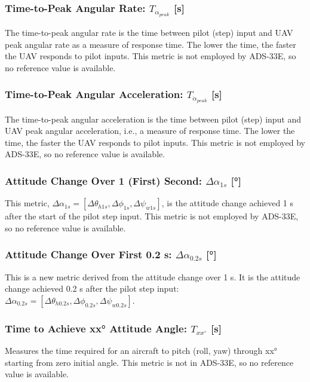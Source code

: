 \subsubsection{Time-to-Peak Angular Rate: \(T_{\dot{\alpha}_{peak}}\) [s]}
The time-to-peak angular rate is the time between pilot (step) input and UAV peak angular rate as a measure of response time. The lower the time, the faster the UAV responds to pilot inputs. This metric is not employed by ADS-33E, so no reference value is available.

\subsubsection{Time-to-Peak Angular Acceleration: \(T_{\dot{\alpha}_{peak}}\) [s]}
The time-to-peak angular acceleration is the time between pilot (step) input and UAV peak angular acceleration, i.e., a measure of response time. The lower the time, the faster the UAV responds to pilot inputs. This metric is not employed by ADS-33E, so no reference value is available.

\subsubsection{Attitude Change Over 1 (First) Second: \(\Delta\alpha_{1s}\) [°]}
This metric, \(\Delta\alpha_{1s} = [ \Delta\theta_{h1s}, \Delta\phi_{1s}, \Delta\psi_{w1s} ]\), is the attitude change achieved 1 s after the start of the pilot step input. This metric is not employed by ADS-33E, so no reference value is available.

\subsubsection{Attitude Change Over First 0.2 s: \(\Delta\alpha_{0.2s}\) [°]}
This is a new metric derived from the attitude change over 1 s. It is the attitude change achieved 0.2 s after the pilot step input: \(\Delta\alpha_{0.2s} = [ \Delta\theta_{h0.2s}, \Delta\phi_{0.2s}, \Delta\psi_{w0.2s} ]\). 

\subsubsection{Time to Achieve xx° Attitude Angle: \(T_{xx^{\circ}}\) [s]}
Measures the time required for an aircraft to pitch (roll, yaw) through xx° starting from zero initial angle. This metric is not in ADS-33E, so no reference value is available.

